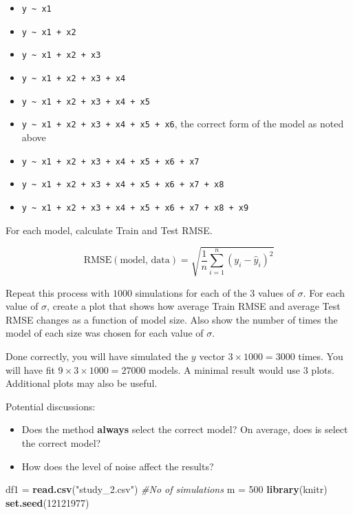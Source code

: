 \documentclass[
]{article}
\newenvironment{Shaded}{\begin{snugshade}}{\end{snugshade}}
\newcommand{\CommentTok}[1]{\textcolor[rgb]{0.56,0.35,0.01}{\textit{#1}}}
\newcommand{\DecValTok}[1]{\textcolor[rgb]{0.00,0.00,0.81}{#1}}
\newcommand{\KeywordTok}[1]{\textcolor[rgb]{0.13,0.29,0.53}{\textbf{#1}}}
\newcommand{\NormalTok}[1]{#1}
\newcommand{\StringTok}[1]{\textcolor[rgb]{0.31,0.60,0.02}{#1}}
\providecommand{\tightlist}{%
  \setlength{\itemsep}{0pt}\setlength{\parskip}{0pt}}
\begin{document}
\begin{itemize}
\tightlist
\item
  \texttt{y\ \textasciitilde{}\ x1}
\item
  \texttt{y\ \textasciitilde{}\ x1\ +\ x2}
\item
  \texttt{y\ \textasciitilde{}\ x1\ +\ x2\ +\ x3}
\item
  \texttt{y\ \textasciitilde{}\ x1\ +\ x2\ +\ x3\ +\ x4}
\item
  \texttt{y\ \textasciitilde{}\ x1\ +\ x2\ +\ x3\ +\ x4\ +\ x5}
\item
  \texttt{y\ \textasciitilde{}\ x1\ +\ x2\ +\ x3\ +\ x4\ +\ x5\ +\ x6},
  the correct form of the model as noted above
\item
  \texttt{y\ \textasciitilde{}\ x1\ +\ x2\ +\ x3\ +\ x4\ +\ x5\ +\ x6\ +\ x7}
\item
  \texttt{y\ \textasciitilde{}\ x1\ +\ x2\ +\ x3\ +\ x4\ +\ x5\ +\ x6\ +\ x7\ +\ x8}
\item
  \texttt{y\ \textasciitilde{}\ x1\ +\ x2\ +\ x3\ +\ x4\ +\ x5\ +\ x6\ +\ x7\ +\ x8\ +\ x9}
\end{itemize}

For each model, calculate Train and Test RMSE.

\[
\text{RMSE}(\text{model, data}) = \sqrt{\frac{1}{n} \sum_{i = 1}^{n}(y_i - \hat{y}_i)^2}
\]

Repeat this process with \(1000\) simulations for each of the \(3\)
values of \(\sigma\). For each value of \(\sigma\), create a plot that
shows how average Train RMSE and average Test RMSE changes as a function
of model size. Also show the number of times the model of each size was
chosen for each value of \(\sigma\).

Done correctly, you will have simulated the \(y\) vector \(3×1000=3000\)
times. You will have fit \(9×3×1000=27000\) models. A minimal result
would use \(3\) plots. Additional plots may also be useful.

Potential discussions:

\begin{itemize}
\tightlist
\item
  Does the method \textbf{always} select the correct model? On average,
  does is select the correct model?
\item
  How does the level of noise affect the results?
\end{itemize}

\begin{Shaded}
\begin{Highlighting}[]
\NormalTok{df1 =}\StringTok{ }\KeywordTok{read.csv}\NormalTok{(}\StringTok{"study_2.csv"}\NormalTok{)}
\CommentTok{#No of simulations}
\NormalTok{m =}\StringTok{ }\DecValTok{500}
\KeywordTok{library}\NormalTok{(knitr)}
\KeywordTok{set.seed}\NormalTok{(}\DecValTok{12121977}\NormalTok{)}
\end{Highlighting}
\end{Shaded}
\end{document}
